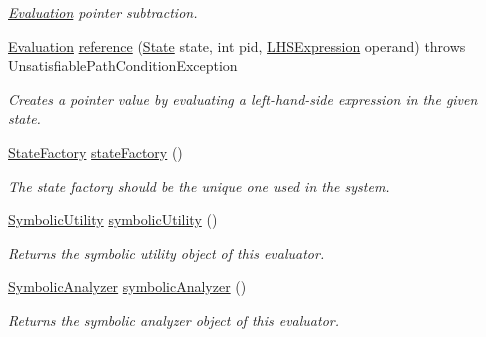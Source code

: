 \begin{DoxyCompactItemize}
\begin{DoxyCompactList}\small\item\em \hyperlink{classedu_1_1udel_1_1cis_1_1vsl_1_1civl_1_1semantics_1_1IF_1_1Evaluation}{Evaluation} pointer subtraction. \end{DoxyCompactList}\item 
\hyperlink{classedu_1_1udel_1_1cis_1_1vsl_1_1civl_1_1semantics_1_1IF_1_1Evaluation}{Evaluation} \hyperlink{interfaceedu_1_1udel_1_1cis_1_1vsl_1_1civl_1_1semantics_1_1IF_1_1Evaluator_a8ae34a0c82e4e2dcd91ec5e94daa908a}{reference} (\hyperlink{interfaceedu_1_1udel_1_1cis_1_1vsl_1_1civl_1_1state_1_1IF_1_1State}{State} state, int pid, \hyperlink{interfaceedu_1_1udel_1_1cis_1_1vsl_1_1civl_1_1model_1_1IF_1_1expression_1_1LHSExpression}{L\+H\+S\+Expression} operand)  throws Unsatisfiable\+Path\+Condition\+Exception
\begin{DoxyCompactList}\small\item\em Creates a pointer value by evaluating a left-\/hand-\/side expression in the given state. \end{DoxyCompactList}\item 
\hyperlink{interfaceedu_1_1udel_1_1cis_1_1vsl_1_1civl_1_1state_1_1IF_1_1StateFactory}{State\+Factory} \hyperlink{interfaceedu_1_1udel_1_1cis_1_1vsl_1_1civl_1_1semantics_1_1IF_1_1Evaluator_afd5e399d742b2fcb8bf20d9a354ed925}{state\+Factory} ()
\begin{DoxyCompactList}\small\item\em The state factory should be the unique one used in the system. \end{DoxyCompactList}\item 
\hyperlink{interfaceedu_1_1udel_1_1cis_1_1vsl_1_1civl_1_1dynamic_1_1IF_1_1SymbolicUtility}{Symbolic\+Utility} \hyperlink{interfaceedu_1_1udel_1_1cis_1_1vsl_1_1civl_1_1semantics_1_1IF_1_1Evaluator_a9520cf53287c29ab57e22da335ead295}{symbolic\+Utility} ()
\begin{DoxyCompactList}\small\item\em Returns the symbolic utility object of this evaluator. \end{DoxyCompactList}\item 
\hyperlink{interfaceedu_1_1udel_1_1cis_1_1vsl_1_1civl_1_1semantics_1_1IF_1_1SymbolicAnalyzer}{Symbolic\+Analyzer} \hyperlink{interfaceedu_1_1udel_1_1cis_1_1vsl_1_1civl_1_1semantics_1_1IF_1_1Evaluator_afe4e831762502e4a5b43eeaa89a9396c}{symbolic\+Analyzer} ()
\begin{DoxyCompactList}\small\item\em Returns the symbolic analyzer object of this evaluator. \end{DoxyCompactList}\item 

\end{DoxyCompactItemize}
